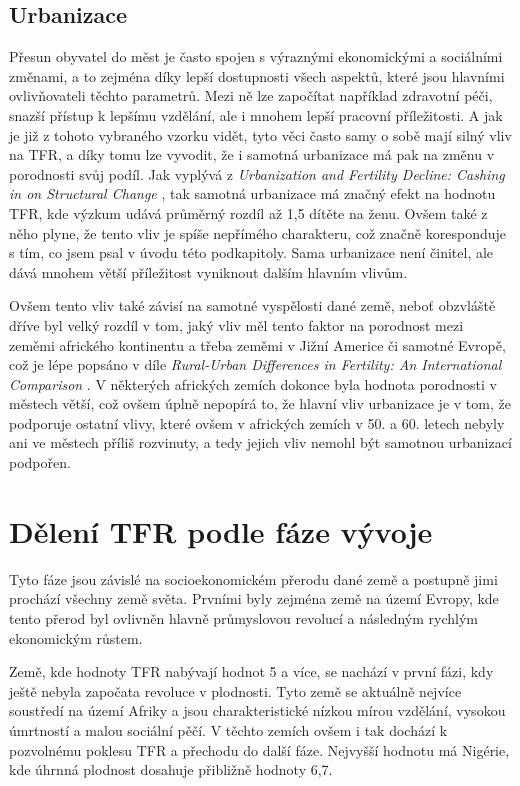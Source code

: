 \documentclass[thesis=M,czech]{FITthesis}[2022/10/08]
\begin{document}
\subsection{Urbanizace}

Přesun obyvatel do měst je často spojen s výraznými ekonomickými a sociálními změnami, a to zejména díky lepší dostupnosti všech aspektů, které jsou hlavními ovlivňovateli těchto parametrů. Mezi ně lze započítat například zdravotní péči, snazší přístup k lepšímu vzdělání, ale i mnohem lepší pracovní příležitosti. A jak je již z tohoto vybraného vzorku vidět, tyto věci často samy o sobě mají silný vliv na TFR, a díky tomu lze vyvodit, že i samotná urbanizace
má pak na změnu v porodnosti svůj podíl.  Jak vyplývá z \textit{Urbanization and Fertility Decline: Cashing in on Structural Change} \cite{Martine}, tak samotná urbanizace má značný efekt na hodnotu TFR, kde výzkum udává průměrný rozdíl až 1,5 dítěte na ženu. Ovšem také z něho plyne, že tento vliv je spíše nepřímého
charakteru, což značně koresponduje s tím, co jsem psal v úvodu této
podkapitoly. Sama urbanizace není činitel, ale dává mnohem větší příležitost vyniknout dalším hlavním vlivům.

Ovšem tento vliv také závisí na samotné vyspělosti dané země, neboť obzvláště dříve byl velký rozdíl v tom, jaký vliv měl tento faktor na porodnost mezi zeměmi afrického kontinentu a třeba zeměmi v Jižní Americe či samotné Evropě, což je lépe popsáno v díle \textit{Rural-Urban Differences in Fertility: An International Comparison} \cite{Kuznets}. V některých afrických zemích dokonce byla hodnota porodnosti v městech větší, což ovšem úplně nepopírá to, že hlavní vliv urbanizace je v tom, že podporuje ostatní vlivy, které ovšem v afrických zemích v 50. a 60. letech nebyly ani ve městech příliš rozvinuty, a tedy jejich vliv nemohl  být samotnou urbanizací podpořen.

\section{Dělení TFR podle fáze vývoje }

Tyto fáze jsou závislé na socioekonomickém přerodu dané země a postupně jimi prochází všechny země světa. Prvními byly zejména země na území Evropy, kde tento přerod byl ovlivněn hlavně průmyslovou revolucí a následným rychlým ekonomickým růstem.\cite{Yujie}

Země, kde hodnoty TFR nabývají hodnot 5 a více, se nachází v první fázi, kdy ještě nebyla započata revoluce v plodnosti. Tyto země se aktuálně nejvíce soustředí na území Afriky a jsou charakteristické nízkou mírou vzdělání, vysokou úmrtností a malou sociální pěčí. \cite{openknowlidge} V těchto zemích ovšem i tak dochází k pozvolnému poklesu TFR a přechodu do další fáze. Nejvyšší hodnotu má Nigérie, kde úhrnná plodnost dosahuje přibližně hodnoty 6,7.
\end{document}

